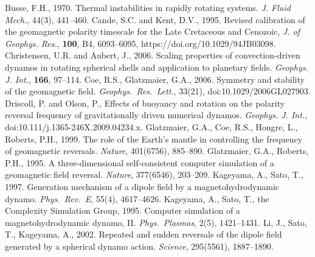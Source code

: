 \begin{thebibliography}{}
%
Busse, F.H., 1970. Thermal instabilities in rapidly rotating systems. {\it J. Fluid Mech.}, 44(3), 441--460.
%
Cande, S.C. and Kent, D.V., 1995. Revised calibration of the geomagnetic polarity timescale for the Late Cretaceous and Cenozoic, {\it J. of Geophys. Res.}, {\bf 100}, B4, 6093--6095, https://doi.org/10.1029/94JB03098.
%
Christensen, U.R. and Aubert, J., 2006. Scaling properties of convection-driven dynamos in rotating spherical shells and application to planetary fields. {\it Geophys. J. Int.}, {\bf 166}, 97–114.
%   
Coe, R.S., Glatzmaier, G.A., 2006. Symmetry and stability of the geomagnetic field. {\it Geophys.\ Res.\ Lett.}, 33(21), doi:10.1029/2006GL027903.
%
Driscoll, P. and Olson, P., Effects of buoyancy and rotation on the polarity reversal frequency of gravitationally driven numerical dynamos. {\it Geophys. J. Int.}, doi:10.111/j.1365-246X.2009.04234.x.
%
Glatzmaier, G.A., Coe, R.S., Hongre, L., Roberts, P.H., 1999. The role of the Earth's mantle in controlling the frequency of geomagnetic reversals. {\it Nature}, 401(6756), 885--890.
%
Glatzmaier, G.A., Roberts, P.H., 1995. A three-dimensional self-consistent computer simulation of a geomagnetic field reversal. {\it Nature}, 377(6546), 203--209.
%
Kageyama, A., Sato, T., 1997. Generation mechanism of a dipole field by a magnetohydrodynamic dynamo. {\it Phys.\ Rev.\ E}, 55(4), 4617--4626.
%
Kageyama, A., Sato, T., the Complexity Simulation Group, 1995. Computer simulation of a magnetohydrodynamic dynamo, II. {\it Phys.\ Plasmas}, 2(5), 1421--1431.
%
Li, J., Sato, T., Kageyama, A., 2002. Repeated and sudden reversals of the dipole field generated by a spherical dynamo action. {\it Science}, 295(5561), 1887--1890.
%

\end{thebibliography}
